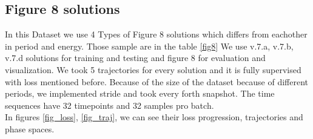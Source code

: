 \subsection{Figure 8 solutions}
In this Dataset we use 4 Types of Figure 8 solutions which differs from eachother in period and energy. Those sample are in the table \ref{fig8} We use v.7.a, v.7.b, v.7.d solutions for training and testing and figure 8 for evaluation and visualization. We took 5 trajectories for every solution and it is fully supervised with loss mentioned before. Because of the size of the dataset because of different periods, we implemented stride and took every forth snapshot. The time sequences have 32 timepoints and 32 samples pro batch. \\
In figures \ref{fig_loss}, \ref{fig_traj}, we can see their loss progression, trajectories and phase spaces.


